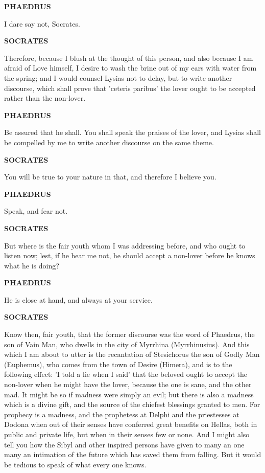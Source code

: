 \documentclass[11pt,letter]{article}
\begin{document}
\par \textbf{PHAEDRUS}
\par   I dare say not, Socrates.

\par \textbf{SOCRATES}
\par   Therefore, because I blush at the thought of this person, and also because I am afraid of Love himself, I desire to wash the brine out of my ears with water from the spring; and I would counsel Lysias not to delay, but to write another discourse, which shall prove that 'ceteris paribus' the lover ought to be accepted rather than the non-lover.

\par \textbf{PHAEDRUS}
\par   Be assured that he shall. You shall speak the praises of the lover, and Lysias shall be compelled by me to write another discourse on the same theme.

\par \textbf{SOCRATES}
\par   You will be true to your nature in that, and therefore I believe you.

\par \textbf{PHAEDRUS}
\par   Speak, and fear not.

\par \textbf{SOCRATES}
\par   But where is the fair youth whom I was addressing before, and who ought to listen now; lest, if he hear me not, he should accept a non-lover before he knows what he is doing?

\par \textbf{PHAEDRUS}
\par   He is close at hand, and always at your service.

\par \textbf{SOCRATES}
\par   Know then, fair youth, that the former discourse was the word of Phaedrus, the son of Vain Man, who dwells in the city of Myrrhina (Myrrhinusius). And this which I am about to utter is the recantation of Stesichorus the son of Godly Man (Euphemus), who comes from the town of Desire (Himera), and is to the following effect:  'I told a lie when I said' that the beloved ought to accept the non-lover when he might have the lover, because the one is sane, and the other mad. It might be so if madness were simply an evil; but there is also a madness which is a divine gift, and the source of the chiefest blessings granted to men. For prophecy is a madness, and the prophetess at Delphi and the priestesses at Dodona when out of their senses have conferred great benefits on Hellas, both in public and private life, but when in their senses few or none. And I might also tell you how the Sibyl and other inspired persons have given to many an one many an intimation of the future which has saved them from falling. But it would be tedious to speak of what every one knows.
\end{document}
